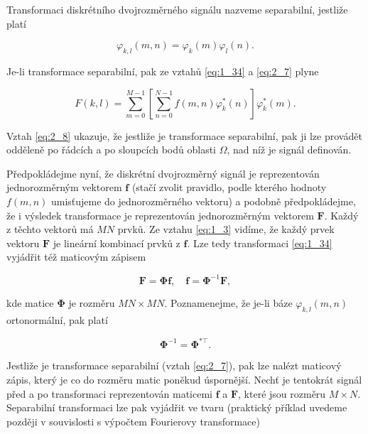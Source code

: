 Transformaci diskrétního dvojrozměrného signálu nazveme separabilní, jestliže platí

\begin{equation} \label{eq:2_7}
    \varphi_{k,l}(m, n) = \varphi_k(m)\varphi_l(n).
\end{equation}

Je-li transformace separabilní, pak ze vztahů \eqref{eq:1_34} a \eqref{eq:2_7} plyne

\begin{equation} \label{eq:2_8}
    F(k,l) = \sum\limits_{m=0}^{M-1}\left[\sum\limits_{n=0}^{N-1}f(m, n) \varphi_k^*(n)\right] \varphi_k^*(m).
\end{equation}

Vztah \eqref{eq:2_8} ukazuje, že jestliže je transformace separabilní, pak ji lze provádět odděleně po řádcích a po sloupcích bodů oblasti $\Omega$, nad níž je signál definován.

Předpokládejme nyní, že diskrétní dvojrozměrný signál je reprezentován jednorozměrným vektorem $\mathbf{f}$  (stačí zvolit pravidlo, podle kterého hodnoty $f(m,n)$ umisťujeme do jednorozměrného vektoru) a podobně předpokládejme, že i výsledek transformace je reprezentován jednorozměrným vektorem $\mathbf{F}$. Každý z těchto vektorů má $MN$ prvků. Ze vztahu \eqref{eq:1_3} vidíme, že každý prvek vektoru $\mathbf{F}$ je lineární kombinací prvků z $\mathbf{f}$. Lze tedy transformaci \eqref{eq:1_34} vyjádřit též maticovým zápisem

\begin{equation} \label{eq:2_9-10}
    \mathbf{F} = \mathbf{\Phi}\mathbf{f}, \quad \mathbf{f} = \mathbf{\Phi}^{-1}\mathbf{F},
\end{equation}

kde matice $\mathbf{\Phi}$ je rozměru $MN \times MN$. Poznamenejme, že je-li báze $\varphi_{k,l}(m,n)$ ortonormální, pak platí

\begin{equation} \label{eq:2_11}
    \mathbf{\Phi}^{-1} = \mathbf{\Phi}^{*\top}.
\end{equation}

Jestliže je transformace separabilní (vztah \eqref{eq:2_7}), pak lze nalézt maticový zápis, který je co do rozměru matic poněkud úspornější. Nechť je tentokrát signál před a po transformaci reprezentován maticemi $\mathbf{f}$ a $\mathbf{F}$, které jsou rozměru $M \times N$. Separabilní transformaci lze pak vyjádřit ve tvaru (praktický příklad uvedeme později v souvislosti s výpočtem Fourierovy transformace)

